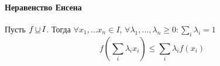 
\setcounter{paragraph}{-1}
\paragraph{Неравенство Енсена}
\begin{thrm}\label{thrm:jensen}
  Пусть $f \,\underline\cup\, I$. Тогда $\forall x_1,\dots x_n\in I$, $ 
  \forall \lambda_1,\dots,\lambda_n \geqslant 0:\sum_i\lambda_i = 1$
  \[
    f\left( \sum_i\lambda_i x_i \right) \leqslant \sum_i \lambda_i f(x_i)
  \]
\end{thrm}
